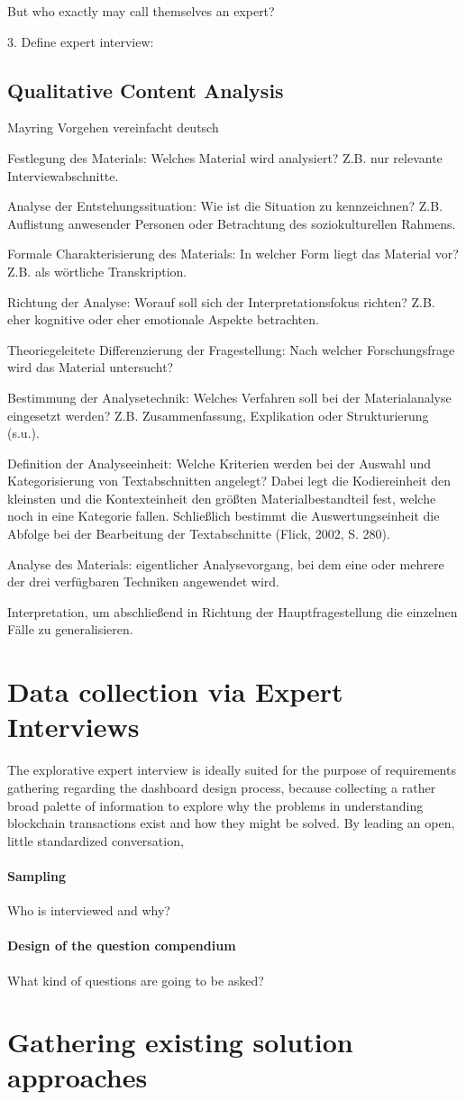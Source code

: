 But who exactly may call themselves an expert? 

3. Define expert interview: 

\subsection{Qualitative Content Analysis}

Mayring Vorgehen vereinfacht deutsch

Festlegung des Materials: Welches Material wird analysiert? Z.B. nur relevante Interviewabschnitte.

Analyse der Entstehungssituation: Wie ist die Situation zu kenn­zeichnen? Z.B. Auflistung anwesender Personen oder Betrachtung des soziokulturellen Rahmens.

Formale Charakterisierung des Materials: In welcher Form liegt das Material vor? Z.B. als wörtliche Transkription.

Richtung der Analyse: Worauf soll sich der Interpretationsfokus richten? Z.B. eher kognitive oder eher emotionale Aspekte be­trachten.

Theoriegeleitete Differenzierung der Fragestellung: Nach welcher Forschungsfrage wird das Material untersucht?

Bestimmung der Analysetechnik: Welches Verfahren soll bei der Materialanalyse eingesetzt werden? Z.B. Zusammenfassung, Explikation oder Strukturierung (s.u.).

Definition der Analyseeinheit: Welche Kriterien werden bei der Auswahl und Kategorisierung von Textabschnitten angelegt? Dabei legt die Kodiereinheit den kleinsten und die Kontexteinheit den größten Materialbestandteil fest, welche noch in eine Kategorie fallen. Schließlich bestimmt die Auswertungseinheit die Abfolge bei der Bearbeitung der Textabschnitte (Flick, 2002, S. 280).

Analyse des Materials: eigentlicher Analysevorgang, bei dem eine oder mehrere der drei verfügbaren Techniken angewendet wird.

Interpretation, um abschließend in Richtung der Hauptfragestellung die einzelnen Fälle zu generalisieren.

\section{Data collection via Expert Interviews}

The explorative expert interview is ideally suited for the purpose of requirements gathering regarding the dashboard design process, because collecting a rather broad palette of information to explore why the problems in understanding blockchain transactions exist and how they might be solved. By leading an open, little standardized conversation,  

\paragraph{Sampling} Who is interviewed and why?

\paragraph{Design of the question compendium} What kind of questions are going to be asked?



\section{Gathering existing solution approaches}